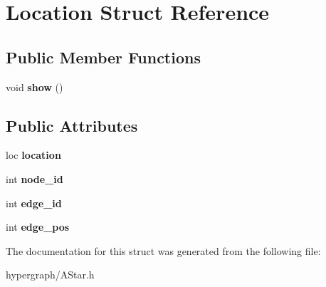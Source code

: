 \hypertarget{structLocation}{
\section{Location Struct Reference}
\label{structLocation}
}
\subsection*{Public Member Functions}
\begin{DoxyCompactItemize}
\item 
\hypertarget{structLocation_ab642adb67565a8235bab7ea58046ca6f}{
void {\bfseries show} ()}
\label{structLocation_ab642adb67565a8235bab7ea58046ca6f}

\end{DoxyCompactItemize}
\subsection*{Public Attributes}
\begin{DoxyCompactItemize}
\item 
\hypertarget{structLocation_a4af801db5d8dcf63154fea7448eadfe2}{
loc {\bfseries location}}
\label{structLocation_a4af801db5d8dcf63154fea7448eadfe2}

\item 
\hypertarget{structLocation_aa412357fd76d12aa5c8d62a550ec7e73}{
int {\bfseries node\_\-id}}
\label{structLocation_aa412357fd76d12aa5c8d62a550ec7e73}

\item 
\hypertarget{structLocation_af6d8cc4a1620560c449be0294f10c56a}{
int {\bfseries edge\_\-id}}
\label{structLocation_af6d8cc4a1620560c449be0294f10c56a}

\item 
\hypertarget{structLocation_a95b07647b61f0fafe3994df2334bec0f}{
int {\bfseries edge\_\-pos}}
\label{structLocation_a95b07647b61f0fafe3994df2334bec0f}

\end{DoxyCompactItemize}


The documentation for this struct was generated from the following file:\begin{DoxyCompactItemize}
\item 
hypergraph/AStar.h\end{DoxyCompactItemize}
